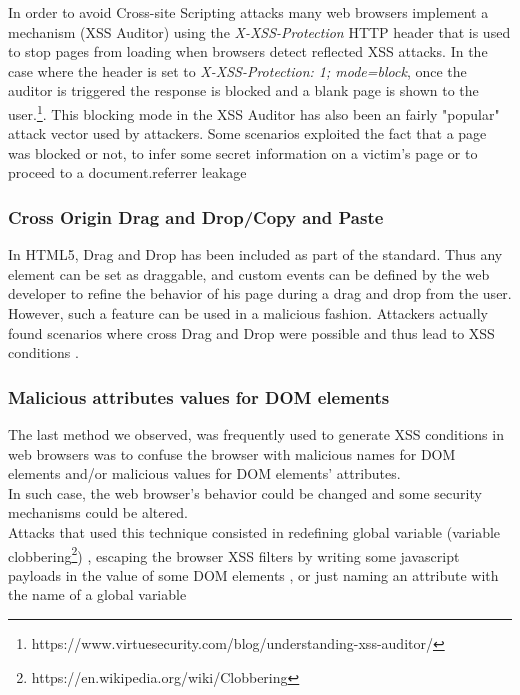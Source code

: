 \documentclass[journal]{IEEEtran}
\begin{document}
In order to avoid Cross-site Scripting attacks many web browsers implement a mechanism (XSS Auditor) using the \emph{X-XSS-Protection} HTTP header that is used to stop pages from loading when browsers detect reflected XSS attacks. In the case where the header is set to \emph{X-XSS-Protection: 1; mode=block}, once the auditor is triggered the response is blocked and a blank page is shown to the user.\footnote{https://www.virtuesecurity.com/blog/understanding-xss-auditor/}. This blocking mode in the XSS Auditor has also been an fairly "popular" attack vector used by attackers. Some scenarios exploited the fact that a page was blocked or not, to infer some secret information on a victim's page or to proceed to a document.referrer leakage \cite{CVE-2017-5045} \cite{CVE-2013-0909} \cite{CVE-2013-2848}

\medskip

\subsubsection*{\textbf{Cross Origin Drag and Drop/Copy and Paste}}

In HTML5, Drag and Drop has been included as part of the standard. Thus any element can be set as draggable, and custom events can be defined by the web developer to refine the behavior of his page during a drag and drop from the user. However, such a feature can be used in a malicious fashion. Attackers actually found scenarios where cross Drag and Drop were possible and thus lead to XSS conditions \cite{CVE-2016-5226} \cite{CVE-2013-2849} \cite{CVE-2012-0455}.

\medskip

\subsubsection*{\textbf{Malicious attributes values for DOM elements}}

The last method we observed, was frequently used to generate XSS conditions in web browsers was to confuse the browser with malicious names for DOM elements and/or malicious values for DOM elements' attributes. \\
In such case, the web browser's behavior could be changed and some security mechanisms could be altered. \\
Attacks that used this technique consisted in redefining global variable (variable clobbering\footnote{https://en.wikipedia.org/wiki/Clobbering}) \cite{frameBustingLocationClubbered}, escaping the browser XSS filters by writing some javascript payloads in the value of some DOM elements \cite{CVE-2013-2849}, or just naming an attribute with the name of a global variable \cite{CVE-2012-4209} \cite{CVE-2012-3994} \cite{CVE-2012-4194}
\end{document}

